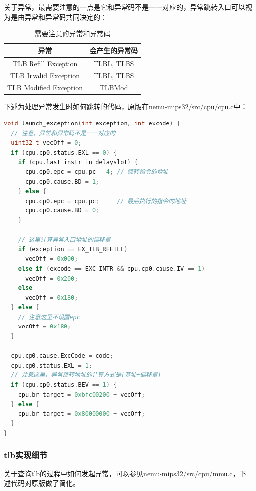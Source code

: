 \documentclass[lang=cn,11pt,a4paper]{elegantpaper}
\begin{document}
关于异常，最需要注意的一点是它和异常码不是一一对应的，异常跳转入口可以视为是由异常和异常码共同决定的：

\begin{table}[H]
\centering
\begin{tabular}{|c|c|}
\hline
异常 & 会产生的异常码 \\\hline
TLB Refill Exception & TLBL, TLBS \\\hline
TLB Invalid Exception & TLBL, TLBS \\\hline
TLB Modified Exception & TLBMod \\\hline
\end{tabular}
\caption{需要注意的异常和异常码}
\end{table}

下述为处理异常发生时如何跳转的代码，原版在nemu-mips32/src/cpu/cpu.c中：
\begin{lstlisting}[language=c]
void launch_exception(int exception, int excode) {
  // 注意，异常和异常码不是一一对应的
  uint32_t vecOff = 0;
  if (cpu.cp0.status.EXL == 0) {
    if (cpu.last_instr_in_delayslot) {
      cpu.cp0.epc = cpu.pc - 4; // 跳转指令的地址
      cpu.cp0.cause.BD = 1;
    } else {
      cpu.cp0.epc = cpu.pc;     // 最后执行的指令的地址
      cpu.cp0.cause.BD = 0;
    }

    // 这里计算异常入口地址的偏移量
    if (exception == EX_TLB_REFILL)
      vecOff = 0x000;
    else if (excode == EXC_INTR && cpu.cp0.cause.IV == 1)
      vecOff = 0x200;
    else
      vecOff = 0x180;
  } else {
    // 注意这里不设置epc
    vecOff = 0x180;
  }

  cpu.cp0.cause.ExcCode = code;
  cpu.cp0.status.EXL = 1;
  // 注意这里，异常跳转地址的计算方式是[基址+偏移量]
  if (cpu.cp0.status.BEV == 1) {
    cpu.br_target = 0xbfc00200 + vecOff;
  } else {
    cpu.br_target = 0x80000000 + vecOff;
  }
}
\end{lstlisting}

\subsubsection{tlb实现细节}

关于查询tlb的过程中如何发起异常，可以参见nemu-mips32/src/cpu/mmu.c，下述代码对原版做了简化。
\end{document}

